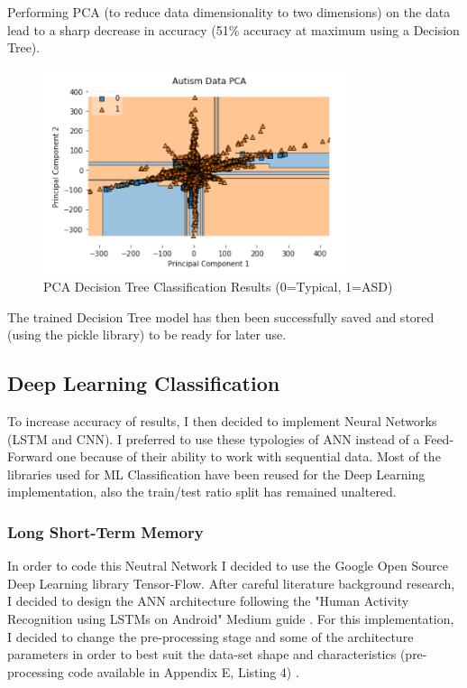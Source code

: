 
% 


Performing PCA (to reduce data dimensionality to two dimensions) on the data lead to a sharp decrease in accuracy (51\% accuracy at maximum using a Decision Tree).

\begin{figure}[ht!]%
    \centering
    \includegraphics[width=9cm]{images/mlpca.PNG}%
    \caption{PCA Decision Tree Classification Results (0=Typical, 1=ASD)}
\end{figure}

The trained Decision Tree model has then been successfully saved and stored (using the pickle library) to be ready for later use.

\subsection{Deep Learning Classification}
To increase accuracy of results, I then decided to implement Neural Networks (LSTM and CNN). I preferred to use these typologies of ANN instead of a Feed-Forward one because of their ability to work with sequential data. Most of the libraries used for ML Classification have been reused for the Deep Learning implementation, also the train/test ratio split has remained unaltered.

\subsubsection{Long Short-Term Memory}
In order to code this Neutral Network I decided to use the Google Open Source Deep Learning library Tensor-Flow. After careful literature background research, I decided to design the ANN architecture following the "Human Activity Recognition using LSTMs on Android" Medium guide \cite{android}. For this implementation, I decided to change the pre-processing stage and some of the architecture parameters in order to best suit the data-set shape and characteristics (pre-processing code available in Appendix E, Listing 4) . 

